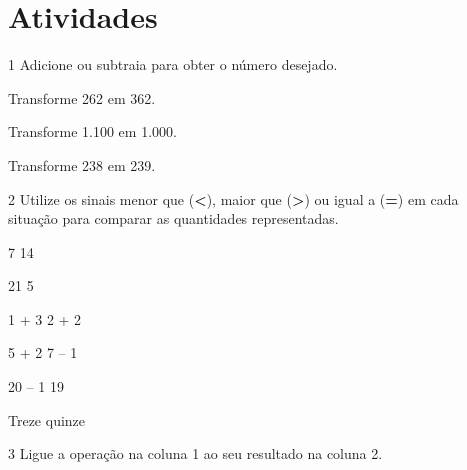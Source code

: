 \pagebreak 

\section*{Atividades}

\num{1} Adicione ou subtraia para obter o número desejado.

\begin{escolha}

\item
  Transforme 262 em 362.\\

\item
  Transforme 1.100 em 1.000.\\

\item
  Transforme 238 em 239.\\
\end{escolha}

\num{2} Utilize os sinais menor que (\textbf{\textless{}}), maior que (\textbf{\textgreater{}}) ou igual a
(\textbf{=}) em cada situação para comparar as quantidades representadas.\bigskip

\begin{minipage}{.5\textwidth}
\begin{escolha}
\item
  7  14
\item
  21  5
\item
  1 + 3  2 + 2
  \end{escolha}
  \end{minipage}
\begin{minipage}{.5\textwidth}
  \begin{escolha}[start=4]
\item
  5 + 2  7 -- 1
\item
  20 -- 1  19
\item
  Treze  quinze
\end{escolha}
\end{minipage}

\pagebreak

\num{3} Ligue a operação na coluna 1 ao seu resultado na coluna 2.

